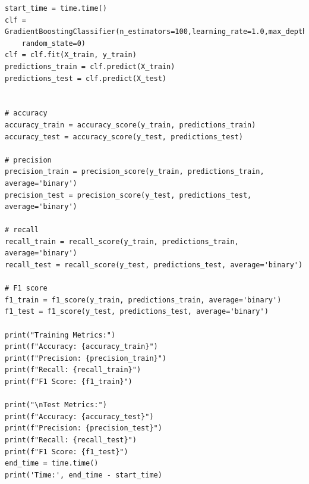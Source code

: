 \documentclass[12pt]{article}
\begin{document}
\begin{verbatim}
start_time = time.time()
clf = GradientBoostingClassifier(n_estimators=100,learning_rate=1.0,max_depth=1,
    random_state=0)
clf = clf.fit(X_train, y_train)
predictions_train = clf.predict(X_train)
predictions_test = clf.predict(X_test)


# accuracy
accuracy_train = accuracy_score(y_train, predictions_train)
accuracy_test = accuracy_score(y_test, predictions_test)

# precision
precision_train = precision_score(y_train, predictions_train, average='binary')
precision_test = precision_score(y_test, predictions_test, average='binary')

# recall
recall_train = recall_score(y_train, predictions_train, average='binary')
recall_test = recall_score(y_test, predictions_test, average='binary')

# F1 score
f1_train = f1_score(y_train, predictions_train, average='binary')
f1_test = f1_score(y_test, predictions_test, average='binary')

print("Training Metrics:")
print(f"Accuracy: {accuracy_train}")
print(f"Precision: {precision_train}")
print(f"Recall: {recall_train}")
print(f"F1 Score: {f1_train}")

print("\nTest Metrics:")
print(f"Accuracy: {accuracy_test}")
print(f"Precision: {precision_test}")
print(f"Recall: {recall_test}")
print(f"F1 Score: {f1_test}")
end_time = time.time()
print('Time:', end_time - start_time)
\end{verbatim}
\end{document}
